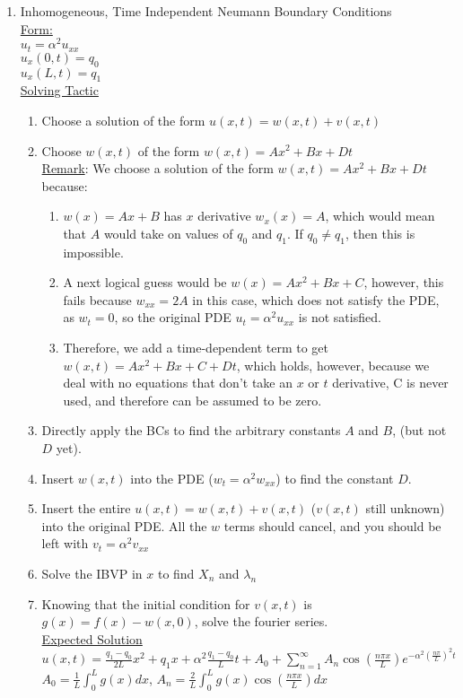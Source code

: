 \documentclass{article}
\begin{document}
\begin{enumerate}
    \item Inhomogeneous, Time Independent Neumann Boundary Conditions
    \medskip\\
    \underline{Form:}
    \medskip\\
    $u_t = \alpha^2 u_{xx}$
    \smallskip\\
    $u_x(0,t) = q_0$\\
    $u_x(L,t) = q_1$
    \medskip\\
    \underline{Solving Tactic}
    \begin{enumerate}
        \item Choose a solution of the form $u(x,t) = w(x,t) + v(x,t)$
        \item Choose $w(x,t)$ of the form $w(x,t) = Ax^2 + Bx + Dt$
        \medskip\\
        \underline{Remark}: We choose a solution of the form $w(x,t) = Ax^2 + Bx + Dt$ because:
        \begin{enumerate}
            \item $w(x) = Ax + B$ has $x$ derivative $w_x(x) = A$, which would mean that $A$ would take on values of $q_0$ and $q_1$. If $q_0 \neq q_1$, then this is impossible.
            \item A next logical guess would be $w(x) = Ax^2 + Bx + C$, however, this fails because $w_{xx} = 2A$ in this case, which does not satisfy the PDE, as $w_t = 0$, so the original PDE $u_t = \alpha^2 u_{xx}$ is not satisfied.
            \item Therefore, we add a time-dependent term to get $w(x,t) = Ax^2 + Bx + C + Dt$, which holds, however, because we deal with no equations that don't take an $x$ or $t$ derivative, C is never used, and therefore can be assumed to be zero.
        \end{enumerate}
        \item Directly apply the BCs to find the arbitrary constants $A$ and $B$, (but not $D$ yet).
        \item Insert $w(x,t)$ into the PDE ($w_t = \alpha^2 w_{xx}$) to find the constant $D$.
        \item Insert the entire $u(x,t) = w(x,t) + v(x,t)$ ($v(x,t)$ still unknown) into the original PDE. All the $w$ terms should cancel, and you should be left with $v_t = \alpha^2 v_{xx}$
        \item Solve the IBVP in $x$ to find $X_n$ and $\lambda_n$
        \item Knowing that the initial condition for $v(x,t)$ is $g(x) = f(x) - w(x,0)$, solve the fourier series.
        \medskip\\
        \underline{Expected Solution}
        \medskip\\
        $u(x,t) = \frac{q_1 - q_0}{2L}x^2 + q_1x + \alpha^2\frac{q_1 - q_0}{L}t + A_0 + \sum_{n=1}^\infty A_n\cos\left(\frac{n\pi x}{L}\right)e^{-\alpha^2 \left(\frac{n\pi}{L}\right)^2 t}$
        \medskip\\
        $A_0 = \frac{1}{L} \int_0^L g(x)dx$, $A_n = \frac{2}{L}\int_0^L g(x) \cos\left(\frac{n\pi x}{L}\right)dx$
    \end{enumerate}
    



\end{enumerate}
\end{document}
